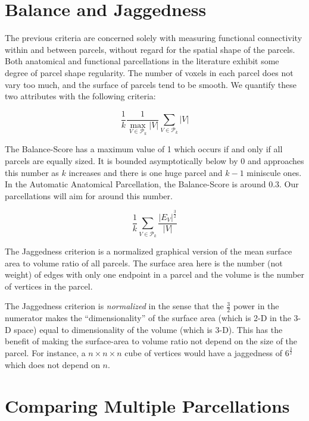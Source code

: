 \section{Balance and Jaggedness}

The previous criteria are concerned solely with measuring functional
connectivity within and between parcels, without regard for the spatial
shape of the parcels.
Both anatomical and functional parcellations in the literature exhibit
some degree of parcel shape regularity. The number of voxels in each
parcel does not vary too much, and the surface of parcels tend to be
smooth. We quantify these two attributes with the following criteria:

\begin{definition}[Balance] \label{balance}
\[ \frac{1}{k} \frac{1}{\underset{V \in \mathcal{P}_k}{\max} |V|}
   \sum_{V \in \mathcal{P}_k} |V| \]
\end{definition}

The Balance-Score has a maximum value of 1 which occurs if and only if
all parcels are equally sized. It is bounded asymptotically below by 0
and approaches this number as $k$ increases and there is one huge
parcel and $k - 1$ miniscule ones. In the Automatic Anatomical
Parcellation, the Balance-Score is around $0.3$. Our parcellations will
aim for around this number.

\begin{definition}[Jaggedness] \label{jaggedness}
\[ \frac{1}{k} \sum_{V \in \mathcal{P}_k} \frac{|E_V|^\frac{3}{2}}{|V|}
\]
\end{definition}

The Jaggedness criterion is a normalized graphical version of the mean
surface area to volume ratio of all parcels. The surface area here is
the number (not weight) of edges with only one endpoint in a parcel and
the volume is the number of vertices in the parcel.

The Jaggedness criterion is \textit{normalized} in the sense that the
$\frac{3}{2}$ power in the numerator makes the ``dimensionality'' of the
surface area (which is 2-D in the 3-D space) equal to dimensionality of
the volume (which is 3-D). This has the benefit of making the
surface-area to volume ratio not depend on the size of the parcel.
For instance, a $n \times n \times n$ cube of vertices would have
a jaggedness of $6^{\frac{3}{2}}$ which does not depend on $n$.

\section{Comparing Multiple Parcellations}

